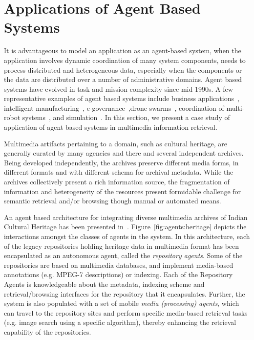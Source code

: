 \section{Applications of Agent Based Systems}

It is advantageous to model an application as an agent-based system, when the application involves dynamic coordination of
many system components, needs to process distributed and heterogeneous data, especially when the components or the data are distributed 
over a number of administrative domains. Agent based systems have evolved in task and mission complexity since mid-1990s. A few 
representative examples of agent based systems include business applications~\citep{Jennings:1996},
intelligent manufacturing~\citep{Shen:2006}, e-governance~\citep{Chaabane:2015},drone swarms~\citep{Shrit:2017,Lomonaco:2018}, 
coordination of multi-robot systems~\citep{Chen:2020}, and simulation~\citep{Davidsson:2007,Kim:2020}. In this section, we present 
a case study of application of agent based systems in multimedia information retrieval.

Multimedia artifacts pertaining to a domain, such as cultural heritage, are generally curated by many agencies and there and 
several independent archives. Being developed independently, the archives preserve different media forms, in different formats 
and with different schema for archival metadata. While the archives collectively present a rich information source, the 
fragmentation of information and heterogeneity of the resources present formidable challenge for semantic retrieval and/or 
browsing though manual or automated means.

An agent based architecture for integrating diverse multimedia archives of Indian Cultural Heritage has been presented 
in~\citep{Ghosh:2008,Chaudhury:2011}. Figure~\ref{fig:agents:heritage} depicts the interactions amongst the classes of 
agents in the system. In this architecture, each of the legacy repositories holding heritage data in
multimedia format has been encapsulated as an autonomous agent, called the {\em repository agents}. Some of the
repositories are based on multimedia databases, and implement media-based annotations (e.g. MPEG-7 descriptions) or indexing.
Each of the Repository Agents is knowledgeable about the metadata, indexing scheme and retrieval/browsing interfaces for the 
repository that it encapsulates. Further, the system is also populated with a set of mobile {\em media (processing) agents}, 
which can travel to the repository sites and perform specific media-based retrieval tasks (e.g. image search using a 
specific algorithm), thereby enhancing the retrieval capability of the repositories.

